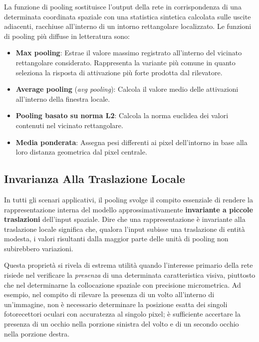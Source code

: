 ﻿\documentclass[11pt, a4paper]{article}
\begin{document}
La funzione di pooling sostituisce l'output della rete in corrispondenza di una determinata coordinata spaziale con una statistica sintetica calcolata sulle uscite adiacenti, racchiuse all'interno di un intorno rettangolare localizzato. Le funzioni di pooling più diffuse in letteratura sono:
\begin{itemize}
    \item \textbf{Max pooling}: Estrae il valore massimo registrato all'interno del vicinato rettangolare considerato. Rappresenta la variante più comune in quanto seleziona la risposta di attivazione più forte prodotta dal rilevatore.
    \item \textbf{Average pooling} (\emph{avg pooling}): Calcola il valore medio delle attivazioni all'interno della finestra locale.
    \item \textbf{Pooling basato su norma L2}: Calcola la norma euclidea dei valori contenuti nel vicinato rettangolare.
    \item \textbf{Media ponderata}: Assegna pesi differenti ai pixel dell'intorno in base alla loro distanza geometrica dal pixel centrale.
\end{itemize}

\subsection{Invarianza Alla Traslazione Locale}

In tutti gli scenari applicativi, il pooling svolge il compito essenziale di rendere la rappresentazione interna del modello approssimativamente \textbf{invariante a piccole traslazioni} dell'input spaziale. Dire che una rappresentazione è invariante alla traslazione locale significa che, qualora l'input subisse una traslazione di entità modesta, i valori risultanti dalla maggior parte delle unità di pooling non subirebbero variazioni.

Questa proprietà si rivela di estrema utilità quando l'interesse primario della rete risiede nel verificare la \emph{presenza} di una determinata caratteristica visiva, piuttosto che nel determinarne la collocazione spaziale con precisione micrometrica.
Ad esempio, nel compito di rilevare la presenza di un volto all'interno di un'immagine, non è necessario determinare la posizione esatta dei singoli fotorecettori oculari con accuratezza al singolo pixel; è sufficiente accertare la presenza di un occhio nella porzione sinistra del volto e di un secondo occhio nella porzione destra.

\end{document}
